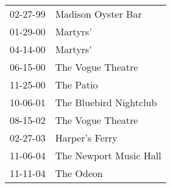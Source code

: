 \begin{supertabular}{p{0.25\columnwidth}p{0.75\columnwidth}}
 02-27-99 &      Madison Oyster Bar \\
 01-29-00 &                Martyrs' \\
 04-14-00 &                Martyrs' \\
 06-15-00 &       The Vogue Theatre \\
 11-25-00 &               The Patio \\
 10-06-01 &  The Bluebird Nightclub \\
 08-15-02 &       The Vogue Theatre \\
 02-27-03 &          Harper's Ferry \\
 11-06-04 &  The Newport Music Hall \\
 11-11-04 &               The Odeon \\
\end{supertabular}
